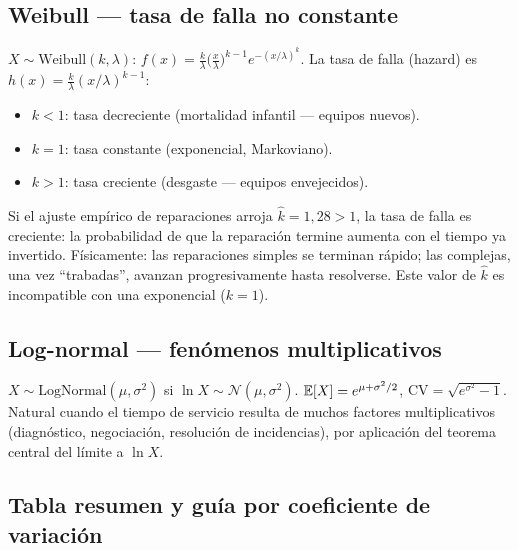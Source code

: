 \documentclass[11pt, letterpaper]{article}
\begin{document}
\subsection{Weibull --- tasa de falla no constante}

$X \sim \text{Weibull}(k,\lambda)$: $f(x) = \frac{k}{\lambda}\bigl(\frac{x}{\lambda}\bigr)^{k-1}e^{-(x/\lambda)^k}$. La tasa de falla (hazard) es $h(x) = \frac{k}{\lambda}(x/\lambda)^{k-1}$:

\begin{itemize}
    \item $k<1$: tasa decreciente (mortalidad infantil --- equipos nuevos).
    \item $k=1$: tasa constante (exponencial, Markoviano).
    \item $k>1$: tasa creciente (desgaste --- equipos envejecidos).
\end{itemize}

\begin{ejemplobox}[Reparaciones del taller: $k=1{,}28$]
Si el ajuste empírico de reparaciones arroja $\hat k = 1{,}28 > 1$, la tasa de falla es creciente: la probabilidad de que la reparación termine aumenta con el tiempo ya invertido. Físicamente: las reparaciones simples se terminan rápido; las complejas, una vez ``trabadas'', avanzan progresivamente hasta resolverse. Este valor de $\hat k$ es incompatible con una exponencial ($k=1$).
\end{ejemplobox}

\subsection{Log-normal --- fenómenos multiplicativos}

$X \sim \text{LogNormal}(\mu,\sigma^2)$ si $\ln X \sim \mathcal{N}(\mu,\sigma^2)$. $\mathbb{E}[X] = e^{\mu+\sigma^2/2}$, $\text{CV}=\sqrt{e^{\sigma^2}-1}$. Natural cuando el tiempo de servicio resulta de muchos factores multiplicativos (diagnóstico, negociación, resolución de incidencias), por aplicación del teorema central del límite a $\ln X$.

\subsection{Tabla resumen y guía por coeficiente de variación}
\end{document}
